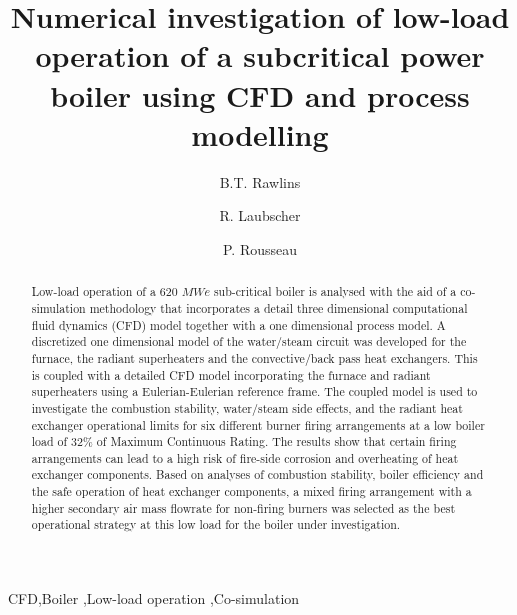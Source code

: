 \documentclass[review]{elsarticle}
\begin{document}
\begin{frontmatter}

\title{Numerical investigation of low-load operation of a subcritical power boiler using CFD and process modelling}

\author{B.T. Rawlins}
\author{R. Laubscher}
\author{P. Rousseau}
\address{Department of Mechanical Engineering, Applied Thermal-Fluid Process Modelling Research Unit, University of Cape Town, Library Rd, Rondebosch, Cape Town, 7701, South Africa}
\address{$^*$ Department of Mechanical Engineering, Stellenbosch University, Stellenbosch Central, Stellenbosch, 7599, South-Africa}

\begin{abstract}
Low-load operation of a 620 $MWe$ sub-critical boiler is analysed with the aid of a co-simulation methodology that incorporates a detail three dimensional computational fluid dynamics (CFD) model together with a one dimensional process model. A discretized one dimensional model of the water/steam circuit was developed for the furnace, the radiant superheaters and the convective/back pass heat exchangers. This is coupled with a detailed CFD model incorporating the furnace and radiant superheaters using a Eulerian-Eulerian reference frame. The coupled model is used to investigate the combustion stability, water/steam side effects, and the radiant heat exchanger operational limits for six different burner firing arrangements at a low boiler load of 32\% of Maximum Continuous Rating. The results show that certain firing arrangements can lead to a high risk of fire-side corrosion and overheating of heat exchanger components. Based on analyses of combustion stability, boiler efficiency and the safe operation of heat exchanger components, a mixed firing arrangement with a higher secondary air mass flowrate for non-firing burners was selected as the best operational strategy at this low load for the boiler under investigation.
\end{abstract}

\begin{keyword}
CFD\sep Boiler \sep Low-load operation \sep Co-simulation
\end{keyword}
\newpage
\end{frontmatter}

\printnomenclature
\end{document}
